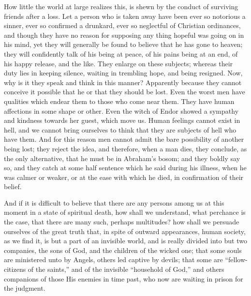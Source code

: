 How little the world at large realizes this, is shewn by the
conduct of surviving friends after a loss. Let a person who is taken
away have been ever so notorious a sinner, ever so confirmed a
drunkard, ever so neglectful of Christian ordinances, and though they
have no reason for supposing any thing hopeful was going on in his
mind, yet they will generally be found to believe that he has gone to
heaven; they will confidently talk of his being at peace, of his pains
being at an end, of his happy release, and the like. They enlarge on
these subjects; whereas their duty lies in keeping silence, waiting in
trembling hope, and being resigned. Now, why is it they speak and
think in this manner? Apparently because they cannot conceive it
possible that he or that they should be lost. Even the worst men have
qualities which endear them to those who come near them. They have
human affections in some shape or other. Even the witch of Endor
showed a sympathy and kindness towards her guest, which move us. Human
feelings cannot exist in hell, and we cannot bring ourselves to think
that they are subjects of hell who have them. And for this reason men
cannot admit the bare possibility of another being lost; they reject
the idea, and therefore, when a man dies, they conclude, as the only
alternative, that he must be in Abraham's bosom; and they boldly say
so, and they catch at some half sentence which he said during his
illness, when he was calmer or weaker, or at the ease with which he
died, in confirmation of their belief.

And if it is difficult to believe that there are any persons among
us at this moment in a state of spiritual death, how shall we
understand, what perchance is the case, that there are many such,
perhaps multitudes? how shall we persuade ourselves of the great truth
that, in spite of outward appearances, human society, as we find it,
is but a part of an invisible world, and is really divided into but
two companies, the sons of God, and the children of the wicked one;
that some souls are ministered unto by Angels, others led captive by
devils; that some are ``fellow-citizens of the saints,'' and
of the invisible ``household of God,'' and others companions
of those His enemies in time past, who now are waiting in prison for
the judgment.

